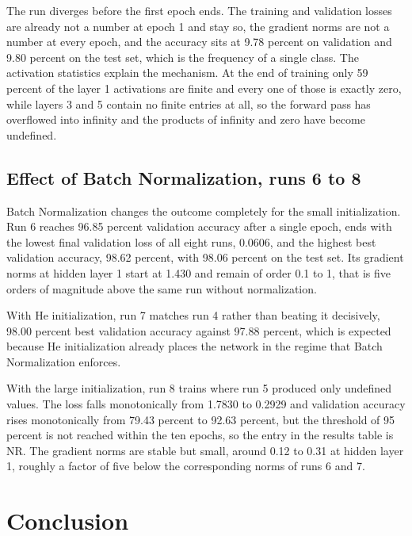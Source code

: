 \documentclass[12pt]{article}
\begin{document}
The run diverges before the first epoch ends. The training and validation losses are already not a number at epoch 1 and stay so, the gradient norms are not a number at every epoch, and the accuracy sits at 9.78 percent on validation and 9.80 percent on the test set, which is the frequency of a single class. The activation statistics explain the mechanism. At the end of training only 59 percent of the layer 1 activations are finite and every one of those is exactly zero, while layers 3 and 5 contain no finite entries at all, so the forward pass has overflowed into infinity and the products of infinity and zero have become undefined.

\subsection{Effect of Batch Normalization, runs 6 to 8}

Batch Normalization changes the outcome completely for the small initialization. Run 6 reaches 96.85 percent validation accuracy after a single epoch, ends with the lowest final validation loss of all eight runs, 0.0606, and the highest best validation accuracy, 98.62 percent, with 98.06 percent on the test set. Its gradient norms at hidden layer 1 start at 1.430 and remain of order 0.1 to 1, that is five orders of magnitude above the same run without normalization.

With He initialization, run 7 matches run 4 rather than beating it decisively, 98.00 percent best validation accuracy against 97.88 percent, which is expected because He initialization already places the network in the regime that Batch Normalization enforces.

With the large initialization, run 8 trains where run 5 produced only undefined values. The loss falls monotonically from 1.7830 to 0.2929 and validation accuracy rises monotonically from 79.43 percent to 92.63 percent, but the threshold of 95 percent is not reached within the ten epochs, so the entry in the results table is NR. The gradient norms are stable but small, around 0.12 to 0.31 at hidden layer 1, roughly a factor of five below the corresponding norms of runs 6 and 7.

\section{Conclusion}
\end{document}
